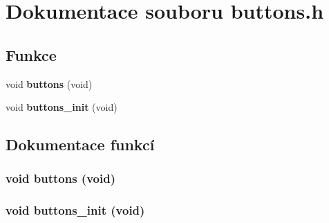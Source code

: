 \section{Dokumentace souboru buttons.h}
\label{buttons_8h}
\subsection*{Funkce}
\begin{DoxyCompactItemize}
\item 
void {\bf buttons} (void)
\item 
void {\bf buttons\_\-init} (void)
\end{DoxyCompactItemize}


\subsection{Dokumentace funkcí}
\subsubsection[{buttons}]{\setlength{\rightskip}{0pt plus 5cm}void buttons (void)}\label{buttons_8h_a82b6a0bb2d8a5f28c7be78d77f07a471}
\subsubsection[{buttons\_\-init}]{\setlength{\rightskip}{0pt plus 5cm}void buttons\_\-init (void)}\label{buttons_8h_acef6dd444cb6560da652897ee43ab306}
